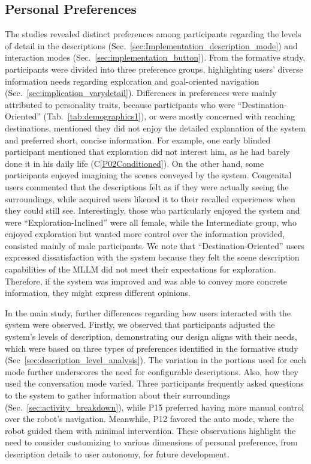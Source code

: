\subsection{Personal Preferences}
The studies revealed distinct preferences among participants regarding the levels of detail in the descriptions (Sec.~\ref{sec:Implementation_description_mode}) and interaction modes (Sec.~\ref{sec:implementation_button}). 
From the formative study, participants were divided into three preference groups, highlighting users' diverse information needs regarding exploration and goal-oriented navigation (Sec.~\ref{sec:implication_varydetail}).
Differences in preferences were mainly attributed to personality traits, because participants who were ``Destination-Oriented'' (Tab.~\ref{tab:demographics1}), or were mostly concerned with reaching destinations, mentioned they did not enjoy the detailed explanation of the system and preferred short, concise information. 
For example, one early blinded participant mentioned that exploration did not interest him, as he had barely done it in his daily life (C\ref{P02Conditioned}). 
On the other hand, some participants enjoyed imagining the scenes conveyed by the system. 
Congenital users commented that the descriptions felt as if they were actually seeing the surroundings, while acquired users likened it to their recalled experiences when they could still see. 
Interestingly, those who particularly enjoyed the system and were ``Exploration-Inclined'' were all female, while the Intermediate group, who enjoyed exploration but wanted more control over the information provided, consisted mainly of male participants.
We note that ``Destination-Oriented'' users expressed dissatisfaction with the system because they felt the scene description capabilities of the MLLM did not meet their expectations for exploration. Therefore, if the system was improved and was able to convey more concrete information, they might express different opinions. 

In the main study, further differences regarding how users interacted with the system were observed. 
Firstly, we observed that participants adjusted the system's levels of description, demonstrating our design aligns with their needs, which were based on three types of preferences identified in the formative study (Sec~\ref{sec:description_level_analysis}). 
The variation in the portions used for each mode further underscores the need for configurable descriptions. 
Also, how they used the conversation mode varied. 
Three participants frequently asked questions to the system to gather information about their surroundings (Sec.~\ref{sec:activity_breakdown}), while P15 preferred having more manual control over the robot’s navigation. 
Meanwhile, P12 favored the auto mode, where the robot guided them with minimal intervention. 
These observations highlight the need to consider customizing to various dimensions of personal preference, from description details to user autonomy, for future development.



